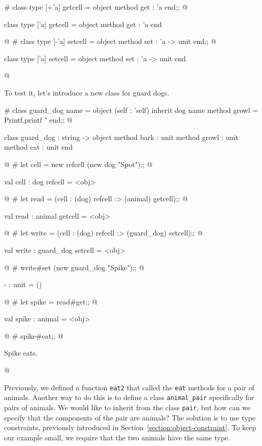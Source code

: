 \begin{ocaml}
# class type [+'a] getcell = object method get : 'a end;;
@
\begin{topoutput}
class type ['a] getcell = object method get : 'a end
\end{topoutput}
@
# class type [-'a] setcell = object method set : 'a -> unit end;;
@
\begin{topoutput}
class type ['a] setcell = object method set : 'a -> unit end
\end{topoutput}
@
\end{ocaml}
%
To test it, let's introduce a new class for guard dogs.

\begin{ocaml}
# class guard_dog name =
    object (self : 'self)
      inherit dog name
      method growl = Printf.printf "%
    end;;
@
\begin{topoutput}
class guard_dog : string ->
  object method bark : unit method growl : unit method eat : unit end
\end{topoutput}
@
# let cell = new refcell (new dog "Spot");;
@
\begin{topoutput}
val cell : dog refcell = <obj>
\end{topoutput}
@
# let read = (cell : (dog) refcell :> (animal) getcell);;
@
\begin{topoutput}
val read : animal getcell = <obj>
\end{topoutput}
@
# let write = (cell : (dog) refcell :> (guard_dog) setcell);;
@
\begin{topoutput}
val write : guard_dog setcell = <obj>
\end{topoutput}
@
# write#set (new guard_dog "Spike");;
@
\begin{topoutput}
- : unit = ()
\end{topoutput}
@
# let spike = read#get;;
@
\begin{topoutput}
val spike : animal = <obj>
\end{topoutput}
@
# spike#eat;;
@
\begin{topoutput}
Spike eats.
\end{topoutput}
@
\end{ocaml}


%
Previously, we defined a function \hbox{\lstinline$eat2$} that called the \hbox{\lstinline$eat$}
methods for a pair of animals.  Another way to do this is to define a class
\hbox{\lstinline$animal_pair$} specifically for pairs of animals.  We would like to inherit from the
class \hbox{\lstinline$pair$}, but how can we specify that the components of the pair are animals?
The solution is to use type constraints, previously introduced in
Section~\ref{section:object-constraint}.  To keep our example small, we require that the two animals
have the same type.

